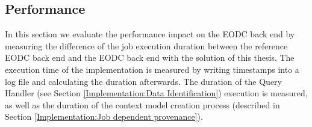 \documentclass[draft,final]{vutinfth} %
\begin{document}
\subsection{Performance}\label{Evaluation:impact_perf}

In this section we evaluate the performance impact on the EODC back end by measuring the difference of the job execution duration between the reference EODC back end and the EODC back end with the solution of this thesis. The execution time of the implementation is measured by writing timestamps into a log file and calculating the duration afterwards. The duration of the Query Handler (see Section \ref{Implementation:Data Identification}) execution is measured, as well as the duration of the context model creation process (described in Section \ref{Implementation:Job dependent provenance}). 
\end{document}
